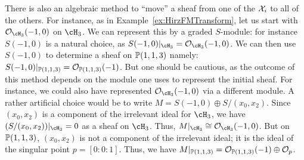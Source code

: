 \documentclass{amsart}
\begin{document}
\begin{remark}
    There is also an algebraic method to ``move'' a sheaf from one of the $\mathcal X_i$ to all of the others.
 For instance, as in Example~\ref{ex:HirzFMTransform}, let us start with $\cO_{\cH_3}(-1,0)$ on $\cH_3$.  We can represent this by a graded $S$-module: for instance $S(-1,0)$ is a natural choice, as $S(-1,0)|_{\cH_3} = \cO_{\cH_3}(-1,0)$.  We can then use $S(-1,0)$ to determine a sheaf on $\mathbb P(1,1,3)$ namely: $S(-1,0)|_{\mathbb P(1,1,3)} = {\mathcal O}_{\mathbb P(1,1,3)}(-1)$. But one should be cautious, as the outcome of this method depends on the module one uses to represent the initial sheaf.  For instance, we could also have represented $\cO_{\cH_3}(-1,0)$ via a different module.  A rather artificial choice would be to write $M=S(-1,0) \oplus S/(x_0,x_2)$.  Since $(x_0,x_2)$ is a component of the irrelevant ideal for $\cH_3$, we have $(S/(x_0,x_2))|_{\cH_3}=0$ as a sheaf on $\cH_3$.  Thus, $M|_{\cH_3} \cong \cO_{\cH_3}(-1,0)$.  But on $\mathbb P(1,1,3)$, $(x_0,x_2)$ is not a component of the irrelevant ideal; it is the ideal of the singular point  $p=[0:0:1]$.  Thus, we have $M|_{\mathbb P(1,1,3)} = {\mathcal O}_{\mathbb P(1,1,3)}(-1) \oplus {\mathcal O}_p$.



\end{remark}
\end{document}
